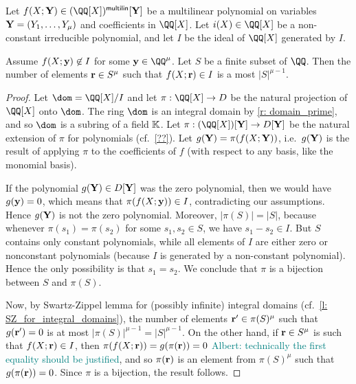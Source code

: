 \documentclass[11pt,letterpaper,usenames,dvipsnames]{article}
\newcommand{\albert}[1]{\textcolor{teal}{Albert: {#1}}}
\begin{document}
    \begin{lemma}
    Let $f(X;\YY) \in (\QQ[X])^{\multilin}[\YY]$ be a multilinear polynomial on variables $\mathbf{Y}= (Y_1,\ldots, Y_\mu)$ and coefficients in $\QQ[X]$. Let $i(X) \in \QQ[X]$ be a non-constant irreducible polynomial, and let $I$ be the ideal of $\QQ[X]$ generated by $I$. 
    
    Assume $f(X;\mathbf{y})\not\in I$ for some $\yy\in \QQ^\mu$. Let $S$ be a finite subset of $\QQ$. Then the number of elements $\mathbf{r}\in S^\mu$ such that $f(X;\mathbf{r})\in I$ is a most $|S|^{\mu-1}$.
    \end{lemma}
    \begin{proof}
    Let $\dom= \QQ[X]/I$ and let  $\pi:\QQ[X] \to D$ be the natural projection of $\QQ[X]$ onto $\dom$. The ring $\dom$ is an integral domain by \cref{r: domain_prime}, and so $\dom$ is a subring of a field $\mathbb{K}$. Let $\pi:(\QQ[X])[\YY]\to D[\YY]$ be the natural extension of $\pi$ for polynomials (cf.\ \cref{??}). Let $g(\mathbf{Y}) = \pi(f(X;\mathbf{Y}))$, i.e.\ $g(\mathbf{Y})$ is the result of applying $\pi$ to the coefficients of $f$ (with respect to any basis, like the monomial basis). 
    
     If the polynomial $g(\mathbf{Y}) \in D[\mathbf{Y}]$ was the zero polynomial, then we would have $g(\mathbf{y}) = 0$, which means that $\pi(f(X;\mathbf{y}))\in I$, contradicting our assumptions. Hence $g(\mathbf{Y})$ is not the zero polynomial. Moreover, $|\pi(S)|=|S|$, because whenever $\pi(s_1) = \pi(s_2)$ for some $s_1,s_2\in S$, we have $s_1 - s_2 \in  I$. But $S$ contains only constant polynomials, while all elements of $I$ are either zero or nonconstant polynomials (because $I$ is generated by a non-constant polynomial). Hence the only possibility is that $s_1=s_2$.  We conclude that $\pi$ is a bijection between $S$ and $\pi(S)$.
     
     Now, by Swartz-Zippel lemma for (possibly infinite) integral domains (cf.\ \cref{l: SZ_for_integral_domains}), the number of elements $\mathbf{r}'\in \pi(S)^\mu$ such that $g(\mathbf{r}')=0$ is at most $|\pi(S)|^{\mu-1}= |S|^{\mu-1}$. On the other hand, if $\mathbf{r}\in S^\mu$ is such that $f(X;\mathbf{r})\in I$, then $\pi(f(X;\mathbf{r}))=g(\pi(\mathbf{r}))=0$ \albert{technically the first equality should be justified}, and so $\pi(\mathbf{r})$ is an element from $\pi(S)^{\mu}$ such that $g(\pi(\mathbf{r}))=0$. Since $\pi$ is a bijection, the result follows.
    \end{proof}
\end{document}
